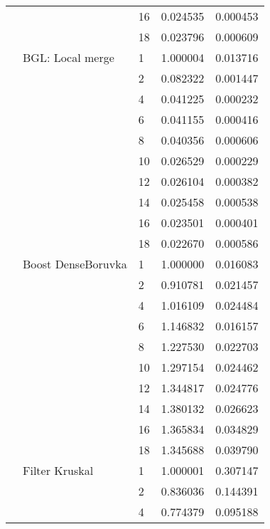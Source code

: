 \begin{tabular}{lllrr}
                      &            & 16 &  0.024535 &  0.000453 \\
                      &            & 18 &  0.023796 &  0.000609 \\
                      & BGL: Local merge & 1  &  1.000004 &  0.013716 \\
                      &            & 2  &  0.082322 &  0.001447 \\
                      &            & 4  &  0.041225 &  0.000232 \\
                      &            & 6  &  0.041155 &  0.000416 \\
                      &            & 8  &  0.040356 &  0.000606 \\
                      &            & 10 &  0.026529 &  0.000229 \\
                      &            & 12 &  0.026104 &  0.000382 \\
                      &            & 14 &  0.025458 &  0.000538 \\
                      &            & 16 &  0.023501 &  0.000401 \\
                      &            & 18 &  0.022670 &  0.000586 \\
                      & Boost DenseBoruvka & 1  &  1.000000 &  0.016083 \\
                      &            & 2  &  0.910781 &  0.021457 \\
                      &            & 4  &  1.016109 &  0.024484 \\
                      &            & 6  &  1.146832 &  0.016157 \\
                      &            & 8  &  1.227530 &  0.022703 \\
                      &            & 10 &  1.297154 &  0.024462 \\
                      &            & 12 &  1.344817 &  0.024776 \\
                      &            & 14 &  1.380132 &  0.026623 \\
                      &            & 16 &  1.365834 &  0.034829 \\
                      &            & 18 &  1.345688 &  0.039790 \\
                      & Filter Kruskal & 1  &  1.000001 &  0.307147 \\
                      &            & 2  &  0.836036 &  0.144391 \\
                      &            & 4  &  0.774379 &  0.095188 \\

\end{tabular}
